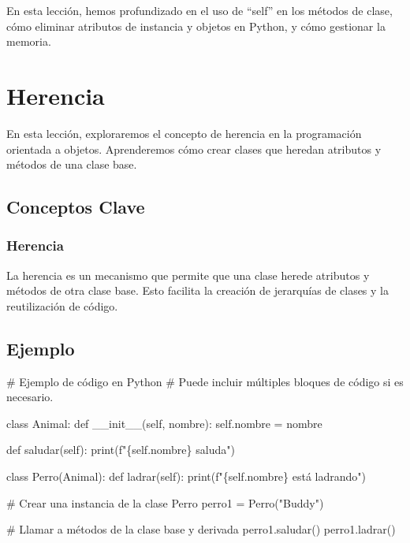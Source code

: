 \documentclass[
  a4paper,
  DIV=11,
  numbers=noendperiod,
  onepage,
  openany]{scrreprt}
\newenvironment{Shaded}{\begin{snugshade}}{\end{snugshade}}
\newcommand{\BuiltInTok}[1]{\textcolor[rgb]{0.00,0.23,0.31}{#1}}
\newcommand{\CommentTok}[1]{\textcolor[rgb]{0.37,0.37,0.37}{#1}}
\newcommand{\FunctionTok}[1]{\textcolor[rgb]{0.28,0.35,0.67}{#1}}
\newcommand{\KeywordTok}[1]{\textcolor[rgb]{0.00,0.23,0.31}{#1}}
\newcommand{\NormalTok}[1]{\textcolor[rgb]{0.00,0.23,0.31}{#1}}
\newcommand{\OperatorTok}[1]{\textcolor[rgb]{0.37,0.37,0.37}{#1}}
\newcommand{\SpecialCharTok}[1]{\textcolor[rgb]{0.37,0.37,0.37}{#1}}
\newcommand{\SpecialStringTok}[1]{\textcolor[rgb]{0.13,0.47,0.30}{#1}}
\newcommand{\StringTok}[1]{\textcolor[rgb]{0.13,0.47,0.30}{#1}}
\newcommand{\VariableTok}[1]{\textcolor[rgb]{0.07,0.07,0.07}{#1}}
\begin{document}
En esta lección, hemos profundizado en el uso de ``self'' en los métodos
de clase, cómo eliminar atributos de instancia y objetos en Python, y
cómo gestionar la memoria.

\chapter{Herencia}\label{herencia}

En esta lección, exploraremos el concepto de herencia en la programación
orientada a objetos. Aprenderemos cómo crear clases que heredan
atributos y métodos de una clase base.

\section{Conceptos Clave}\label{conceptos-clave-24}

\subsection{Herencia}\label{herencia-1}

La herencia es un mecanismo que permite que una clase herede atributos y
métodos de otra clase base. Esto facilita la creación de jerarquías de
clases y la reutilización de código.

\section{Ejemplo}\label{ejemplo-17}

\begin{Shaded}
\begin{Highlighting}[]
\CommentTok{\# Ejemplo de código en Python}
\CommentTok{\# Puede incluir múltiples bloques de código si es necesario.}

\KeywordTok{class}\NormalTok{ Animal:}
    \KeywordTok{def} \FunctionTok{\_\_init\_\_}\NormalTok{(}\VariableTok{self}\NormalTok{, nombre):}
        \VariableTok{self}\NormalTok{.nombre }\OperatorTok{=}\NormalTok{ nombre}

    \KeywordTok{def}\NormalTok{ saludar(}\VariableTok{self}\NormalTok{):}
        \BuiltInTok{print}\NormalTok{(}\SpecialStringTok{f"}\SpecialCharTok{\{}\VariableTok{self}\SpecialCharTok{.}\NormalTok{nombre}\SpecialCharTok{\}}\SpecialStringTok{ saluda"}\NormalTok{)}

\KeywordTok{class}\NormalTok{ Perro(Animal):}
    \KeywordTok{def}\NormalTok{ ladrar(}\VariableTok{self}\NormalTok{):}
        \BuiltInTok{print}\NormalTok{(}\SpecialStringTok{f"}\SpecialCharTok{\{}\VariableTok{self}\SpecialCharTok{.}\NormalTok{nombre}\SpecialCharTok{\}}\SpecialStringTok{ está ladrando"}\NormalTok{)}

\CommentTok{\# Crear una instancia de la clase Perro}
\NormalTok{perro1 }\OperatorTok{=}\NormalTok{ Perro(}\StringTok{"Buddy"}\NormalTok{)}

\CommentTok{\# Llamar a métodos de la clase base y derivada}
\NormalTok{perro1.saludar()}
\NormalTok{perro1.ladrar()}
\end{Highlighting}
\end{Shaded}
\end{document}
